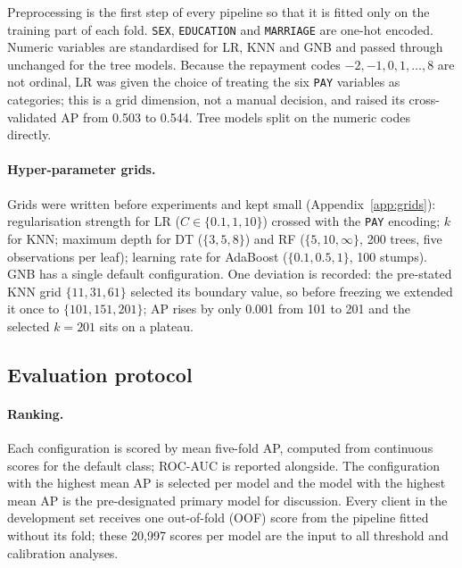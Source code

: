 \documentclass{article}
\begin{document}
Preprocessing is the first step of every pipeline so that it is fitted only on the training part of each fold. \texttt{SEX}, \texttt{EDUCATION} and \texttt{MARRIAGE} are one-hot encoded. Numeric variables are standardised for LR, KNN and GNB and passed through unchanged for the tree models. Because the repayment codes $-2,-1,0,1,\dots,8$ are not ordinal, LR was given the choice of treating the six \texttt{PAY} variables as categories; this is a grid dimension, not a manual decision, and raised its cross-validated AP from 0.503 to 0.544. Tree models split on the numeric codes directly.

\paragraph{Hyper-parameter grids.} Grids were written before experiments and kept small (Appendix~\ref{app:grids}): regularisation strength for LR ($C\in\{0.1,1,10\}$) crossed with the \texttt{PAY} encoding; $k$ for KNN; maximum depth for DT ($\{3,5,8\}$) and RF ($\{5,10,\infty\}$, 200 trees, five observations per leaf); learning rate for AdaBoost ($\{0.1,0.5,1\}$, 100 stumps). GNB has a single default configuration. One deviation is recorded: the pre-stated KNN grid $\{11,31,61\}$ selected its boundary value, so before freezing we extended it once to $\{101,151,201\}$; AP rises by only 0.001 from 101 to 201 and the selected $k=201$ sits on a plateau.

\subsection{Evaluation protocol}
\paragraph{Ranking.} Each configuration is scored by mean five-fold AP, computed from continuous scores for the default class; ROC-AUC is reported alongside. The configuration with the highest mean AP is selected per model and the model with the highest mean AP is the pre-designated primary model for discussion. Every client in the development set receives one out-of-fold (OOF) score from the pipeline fitted without its fold; these 20{,}997 scores per model are the input to all threshold and calibration analyses.
\end{document}

